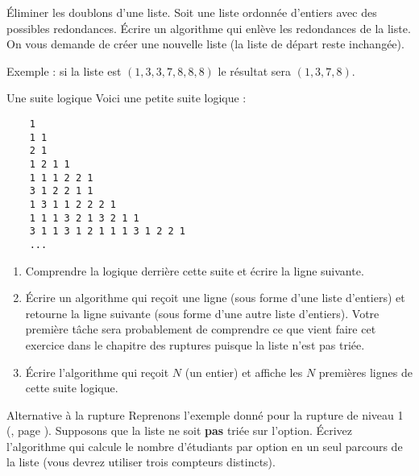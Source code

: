 \begin{Exercice}{Éliminer les doublons d'une liste.}
	Soit une liste ordonnée d'entiers avec des possibles redondances. 
	Écrire un algorithme qui enlève les redondances de la liste. 
	On vous demande de créer une nouvelle liste (la liste de départ reste inchangée).
	
	Exemple : si la liste est $(1, 3, 3, 7, 8, 8, 8)$ 
	le résultat sera $(1, 3, 7, 8)$.
\end{Exercice}

\begin{Exercice}{Une suite logique}
	Voici une petite suite logique :
	
	\begin{minipage}{5cm}
		\small
		\begin{verbatim}
	1
	1 1
	2 1
	1 2 1 1
	1 1 1 2 2 1
	3 1 2 2 1 1
	1 3 1 1 2 2 2 1
	1 1 1 3 2 1 3 2 1 1
	3 1 1 3 1 2 1 1 1 3 1 2 2 1
	...
		\end{verbatim}
	\end{minipage}
	\begin{minipage}{9cm}
		\begin{enumerate}[label=\alph*)]
		\item
			Comprendre la logique derrière cette suite 
			et écrire la ligne suivante.
		\item
			Écrire un algorithme qui reçoit une ligne 
			(sous forme d'une liste d'entiers) 
			et retourne la ligne suivante 
			(sous forme d'une autre liste d'entiers).
			Votre première tâche sera probablement de comprendre 
			ce que vient faire cet exercice dans le chapitre des ruptures puisque la liste n'est pas triée.
		\item
			Écrire l'algorithme qui reçoit $N$ (un entier) 
			et affiche les $N$ premières lignes de cette suite logique.	
		\end{enumerate}
	\end{minipage}
\end{Exercice}

\begin{Exercice}{Alternative à la rupture}
	Reprenons l'exemple donné pour la rupture de niveau 1 (, page \pageref{algo:rupt1}).
	Supposons que la liste ne soit \textbf{pas} triée sur l'option.
	Écrivez l'algorithme qui calcule le nombre d'étudiants par option en un seul parcours de la liste
	(vous devrez utiliser trois compteurs distincts).
\end{Exercice}
